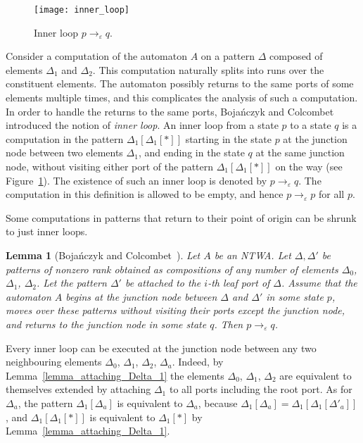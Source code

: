 \documentclass[12pt,a4paper]{article}
\newtheorem{lemma}{Lemma}
\theoremstyle{definition}
\renewcommand{\epsilon}{\varepsilon}
\begin{document}
\begin{figure}[t]
	\centerline{\texttt{[image: inner\_loop]}}
	\caption{Inner loop $p \to_{\epsilon} q$.}
	\label{f:inner_loop}
\end{figure}

Consider a computation of the automaton $A$ on a pattern $\Delta$
composed of elements $\Delta_1$ and $\Delta_2$.
This computation naturally splits into runs over the constituent elements.
The automaton possibly returns to the same ports of some elements multiple times,
and this complicates the analysis of such a computation.
In order to handle the returns to the same ports,
Boja\'nczyk and Colcombet~{\cite[\S 3.2]{BojanczykColcombet_reg}}
introduced the notion of \emph{inner loop}.
An inner loop from a state $p$ to a state $q$
is a computation in the pattern $\Delta_1[\Delta_1[*]]$
starting in the state $p$ at the junction node between two elements $\Delta_1$,
and ending in the state $q$ at the same junction node,
without visiting either port of the pattern $\Delta_1[\Delta_1[*]]$ on the way
(see Figure~\ref{f:inner_loop}).
The existence of such an inner loop is denoted by $p \to_{\epsilon} q$.
The computation in this definition is allowed to be empty,
and hence $p \to_{\epsilon} p$ for all $p$.

Some computations in patterns that return to their point of origin
can be shrunk to just inner loops.
\begin{lemma}[Boja\'nczyk and Colcombet~{\cite[Lemma 3.3]{BojanczykColcombet_reg}}]
\label{lemma_inner_loops}
Let $A$ be an NTWA.
Let $\Delta,\Delta'$ be patterns of nonzero rank
obtained as compositions of any number of elements $\Delta_0$, $\Delta_1$, $\Delta_2$.
Let the pattern $\Delta'$ be attached to the $i$-th leaf port of $\Delta$.
Assume that the automaton $A$ begins at the junction node between $\Delta$ and $\Delta'$ in some state $p$,
moves over these patterns without visiting their ports except the junction node,
and returns to the junction node in some state $q$.
Then $p \to_{\epsilon} q$.
\end{lemma}

Every inner loop can be executed at the junction node
between any two neighbouring elements $\Delta_0$, $\Delta_1$, $\Delta_2$, $\Delta_a$.
Indeed, by Lemma~\ref{lemma_attaching_Delta_1}
the elements $\Delta_0$, $\Delta_1$, $\Delta_2$ are equivalent to themselves
extended by attaching $\Delta_1$ to all ports including the root port.
As for $\Delta_a$,
the pattern $\Delta_1[\Delta_a]$ is equivalent to $\Delta_a$,
because $\Delta_1[\Delta_a] = \Delta_1[\Delta_1[\Delta'_a]]$,
and $\Delta_1[\Delta_1[*]]$ is equivalent to $\Delta_1[*]$
by Lemma~\ref{lemma_attaching_Delta_1}.
\end{document}
